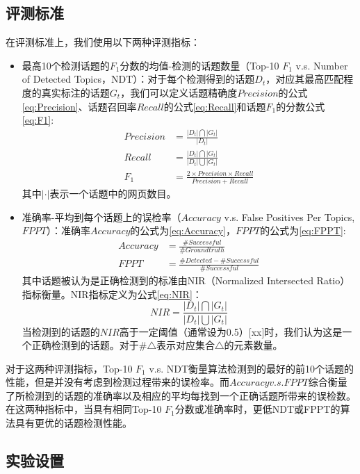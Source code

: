 \subsection{评测标准}
在评测标准上，我们使用以下两种评测指标：
\begin{itemize}
  \item 最高10个检测话题的$F_1$分数的均值-检测的话题数量（Top-10 $F_1$ v.s. Number of Detected Topics，NDT）：对于每个检测得到的话题$D_t$，对应其最高匹配程度的真实标注的话题$G_t$，我们可以定义话题精确度$Precision$的公式\ref{eq:Precision}、话题召回率$Recall$的公式\ref{eq:Recall}和话题$F_1$的分数公式\ref{eq:F1}:
  \begin{align}
    \label{eq:Precision} Precision &= \frac{|D_t| \bigcap |G_t|}{|D_t|}\\
    \label{eq:Recall} Recall &= \frac{|D_t| \bigcap |G_t|}{|D_t| \bigcup |G_t|}\\
    \label{eq:F1} F_1 &= \frac{2\times Precision \times Recall}{Precision + Recall}
  \end{align}
  其中$|\cdot|$表示一个话题中的网页数目。

  \item 准确率-平均到每个话题上的误检率（$Accuracy$ v.s. False Positives Per Topics,$FPPT$）：准确率$Accuracy$的公式为\ref{eq:Accuracy}，$FPPT$的公式为\ref{eq:FPPT}:
  \begin{align}
    \label{eq:Accuracy} Accuracy &= \frac{\#Successful}{\#Groundtruth} \\
    \label{eq:FPPT} FPPT &= \frac{\#Detected - \#Successful}{\#Successful}
  \end{align}
  其中话题被认为是正确检测到的标准由NIR（Normalized Intersected Ratio）指标衡量。NIR指标定义为公式\ref{eq:NIR}：
  \begin{equation}\label{eq:NIR}
    NIR = \frac{|D_t| \bigcap |G_t|}{|D_t| \bigcup |G_t|}
  \end{equation}
  当检测到的话题的$NIR$高于一定阈值（通常设为0.5）[xx]时，我们认为这是一个正确检测到的话题。对于$\# \triangle$表示对应集合$\triangle$的元素数量。
\end{itemize}

对于这两种评测指标，Top-10 $F_1$ v.s. NDT衡量算法检测到的最好的前10个话题的性能，但是并没有考虑到检测过程带来的误检率。而$Accuracy v.s. FPPT$综合衡量了所检测到的话题的准确率以及相应的平均每找到一个正确话题所带来的误检数。在这两种指标中，当具有相同Top-10 $F_1$分数或准确率时，更低NDT或FPPT的算法具有更优的话题检测性能。

\subsection{实验设置}

